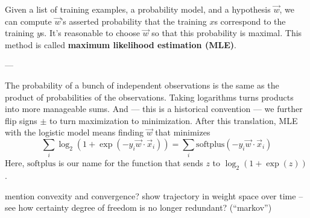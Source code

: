 \documentclass[11pt, justified]{tufte-book}
\newcommand{\attnsam}[1]{{\red \textsf{#1}}}
\newcommand{\sampassage}[1]{
   \vspace{0.1cm}
   \par\noindent{\hspace{-2cm}\normalsize \sc \gre #1} ---
}
\theoremstyle{definition}
\begin{document}
        Given a list of training examples, a probability model, and a
        hypothesis $\vec w$, we can compute $\vec w$'s asserted probability
        that the training $x$s correspond to the training $y$s.  It's
        reasonable to choose $\vec w$ so that this probability is maximal.
        This method is called \textbf{maximum likelihood estimation (MLE)}.


      \sampassage{logistic models} %

        The probability of a bunch of independent observations is the same as
        the product of probabilities of the observations.  Taking logarithms
        turns products into more manageable sums.  And --- this is a historical
        convention --- we further flip signs $\pm$ to turn maximization to 
        minimization.
        After this translation, MLE with the logistic model means finding $\vec
        w$ that minimizes
        $$
          \sum_i \log_2(1+\exp(-y_i\vec w\cdot \vec x_i))
          =
          \sum_i \text{softplus}(-y_i\vec w\cdot \vec x_i) 
        $$
        Here, $\text{softplus}$ is our name for the function that sends
        $z$ to $\log_2(1+\exp(z))$.


        \attnsam{mention convexity and convergence?}
        \attnsam{show trajectory in weight space over time -- see how certainty degree of freedom is no longer redundant? (``markov'')}

\end{document}
